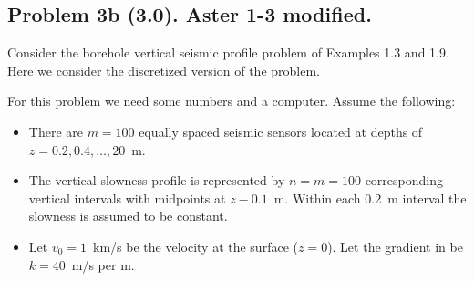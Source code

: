 \documentclass[11pt,titlepage,fleqn]{article}
\begin{document}

\pagebreak
\subsection*{Problem 3b (3.0). Aster 1-3 modified.}

Consider the borehole vertical seismic profile problem of Examples 1.3 and 1.9. Here we consider the discretized version of the problem. 

For this problem we need some numbers and a computer. Assume the following:
%
\begin{itemize}
\item There are $m=100$ equally spaced seismic sensors located at depths of $z = 0.2, 0.4, \ldots, 20$~m.
\item The vertical slowness profile is represented by $n=m=100$ corresponding vertical intervals with midpoints at $z - 0.1$~m. Within each 0.2~m interval the slowness is assumed to be constant.
\item Let $v_0 = 1$~km/s be the velocity at the surface ($z=0$). Let the gradient in  be $k = 40$~m/s per m.
\end{itemize}
\end{document}
